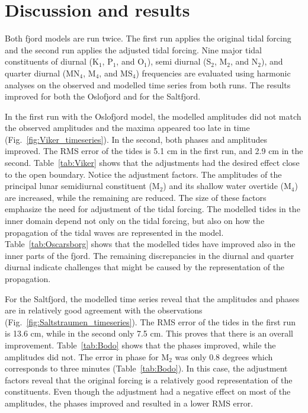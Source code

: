 \section{Discussion and results}

Both fjord models are run twice. The first run applies the original tidal forcing and the second run applies the adjusted tidal forcing. Nine major tidal constituents of diurnal (K$_1$, P$_1$, and O$_1$), semi diurnal (S$_2$, M$_2$, and N$_2$), and quarter diurnal (MN$_4$, M$_4$, and MS$_4$) frequencies are evaluated using harmonic analyses on the observed and modelled time series from both runs. The results improved for both the Oslofjord and for the Saltfjord. 

In the first run with the Oslofjord model, the modelled amplitudes did not match the observed amplitudes and the maxima appeared too late in time (Fig.~\ref{fig:Viker_timeseries}). In the second, both phases and amplitudes improved. 
The RMS error of the tides is 5.1 cm in the first run, and 2.9 cm in the second. 
Table~\ref{tab:Viker} shows that the adjustments had the desired effect close to the open boundary. Notice the adjustment factors. The amplitudes of the principal lunar semidiurnal constituent (M$_2$) and its shallow water overtide (M$_4$) are increased, while the remaining are reduced. The size of these factors emphasize the need for adjustment of the tidal forcing. 
The modelled tides in the inner domain depend not only on the tidal forcing, but also on how the propagation of the tidal waves are represented in the model. Table~\ref{tab:Oscarsborg} shows that the modelled tides have improved also in the inner parts of the fjord. The remaining  discrepancies in the diurnal and quarter diurnal indicate challenges that might be caused by the representation of the propagation.

For the Saltfjord, the modelled time series reveal that the amplitudes and phases are in relatively good agreement with the observations (Fig.~\ref{fig:Saltstraumen_timeseries}). The RMS error of the tides in the first run is 13.6 cm, while in the second only 7.5 cm. This proves that there is an overall improvement. Table~\ref{tab:Bodo} shows that the phases improved, while the amplitudes did not. The error in phase for M$_2$ was only $0.8$ degrees which corresponds to three minutes (Table~\ref{tab:Bodo}). In this case, the adjustment factors reveal that the original forcing is a relatively good representation of the constituents. Even though the adjustment had a negative effect on most of the amplitudes, the phases improved and resulted in a lower RMS error. 

